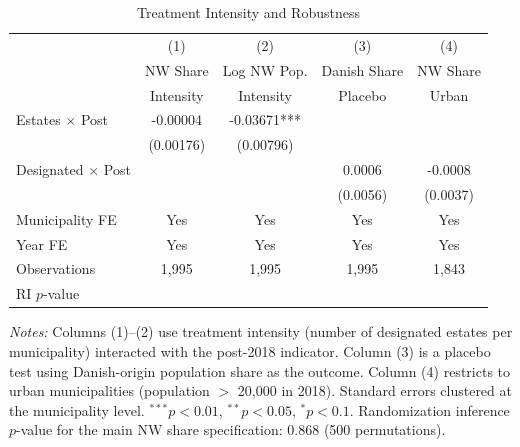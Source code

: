 \begin{table}[htbp]
\centering
\caption{Treatment Intensity and Robustness}
\label{tab:robust}
\begin{tabular}{lcccc}
\hline\hline
 & (1) & (2) & (3) & (4) \\
 & NW Share & Log NW Pop. & Danish Share & NW Share \\
 & Intensity & Intensity & Placebo & Urban \\
\hline
Estates $\times$ Post & -0.00004 & -0.03671*** & & \\
 & (0.00176) & (0.00796) & & \\
Designated $\times$ Post & & & 0.0006 & -0.0008 \\
 & & & (0.0056) & (0.0037) \\
\hline
Municipality FE & Yes & Yes & Yes & Yes \\
Year FE & Yes & Yes & Yes & Yes \\
Observations & 1,995 & 1,995 & 1,995 & 1,843 \\
RI $p$-value & & & & \\
\hline\hline
\end{tabular}
\begin{tablenotes}[flushleft]
\small
\item \textit{Notes:} Columns (1)--(2) use treatment intensity (number of designated estates per municipality) interacted with the post-2018 indicator. Column (3) is a placebo test using Danish-origin population share as the outcome. Column (4) restricts to urban municipalities (population $>$ 20,000 in 2018). Standard errors clustered at the municipality level. $^{***}p<0.01$, $^{**}p<0.05$, $^{*}p<0.1$. Randomization inference $p$-value for the main NW share specification: 0.868 (500 permutations).
\end{tablenotes}
\end{table}
